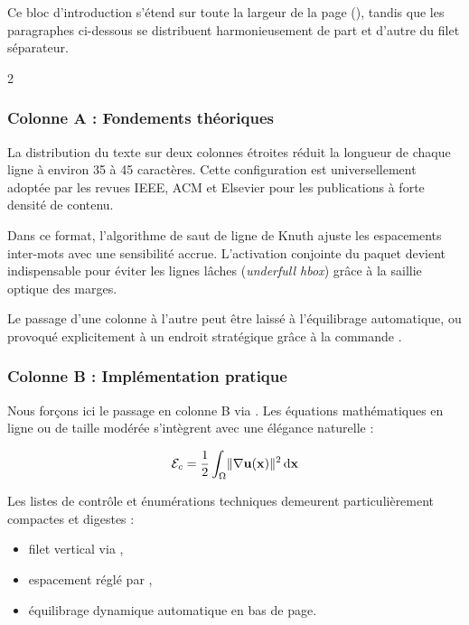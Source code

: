 \begin{callout}
Ce bloc d'introduction s'étend sur toute la largeur de la page (),
tandis que les paragraphes ci-dessous se distribuent harmonieusement de part et d'autre du filet séparateur.
\end{callout}

\begin{multicols}{2}

\subsubsection{Colonne A : Fondements théoriques}
La distribution du texte sur deux colonnes étroites réduit la longueur de chaque ligne
à environ 35 à 45 caractères.
Cette configuration est universellement adoptée par les revues IEEE, ACM et Elsevier
pour les publications à forte densité de contenu.

Dans ce format, l'algorithme de saut de ligne de Knuth ajuste les espacements inter-mots
avec une sensibilité accrue.
L'activation conjointe du paquet  devient indispensable
pour éviter les lignes lâches (\textit{underfull hbox}) grâce à la saillie optique des marges.

Le passage d'une colonne à l'autre peut être laissé à l'équilibrage automatique,
ou provoqué explicitement à un endroit stratégique grâce à la commande .

\columnbreak

\subsubsection{Colonne B : Implémentation pratique}
Nous forçons ici le passage en colonne B via .
Les équations mathématiques en ligne ou de taille modérée
s'intègrent avec une élégance naturelle :

\begin{equation}
  \label{eq:densite-energie}
  \mathcal{E}_c = \frac{1}{2} \int_{\Omega} \lVert\nabla \boldsymbol{\mathbf{u}}(\boldsymbol{\mathbf{x}})\rVert^2 \mathop{}\!\mathrm{d} \boldsymbol{\mathbf{x}}
\end{equation}

Les listes de contrôle et énumérations techniques
demeurent particulièrement compactes et digestes :
\begin{itemize}
  \item filet vertical via ,
  \item espacement réglé par ,
  \item équilibrage dynamique automatique en bas de page.
\end{itemize}

\end{multicols}

